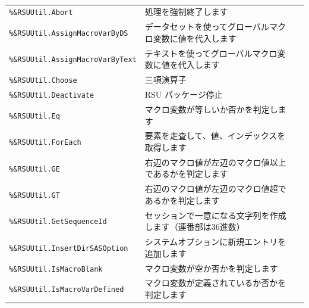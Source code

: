 \paragraph{\DocStrTitleRDMPackageFunctionList}
\begin{center}
{\footnotesize
\begin{xltabular}{\textwidth}{|p{4truecm}|X|p{1.2truecm}|}
\hline
\thead{\DocStrHeaderFunctionName}&\thead{\DocStrDescription}&\thead{\DocStrRefto}\\
\hline
\hline
\texttt{\%\&RSUUtil.Abort}&処理を強制終了します&\\
\hline
\texttt{\%\&RSUUtil.AssignMacroVarByDS}&データセットを使ってグローバルマクロ変数に値を代入します&\\
\hline
\texttt{\%\&RSUUtil.AssignMacroVarByText}&テキストを使ってグローバルマクロ変数に値を代入します&\\
\hline
\texttt{\%\&RSUUtil.Choose}&三項演算子&\\
\hline
\texttt{\%\&RSUUtil.Deactivate}&RSU パッケージ停止&\\
\hline
\texttt{\%\&RSUUtil.Eq}&マクロ変数が等しいか否かを判定します&\\
\hline
\texttt{\%\&RSUUtil.ForEach}&要素を走査して、値、インデックスを取得します&\\
\hline
\texttt{\%\&RSUUtil.GE}&右辺のマクロ値が左辺のマクロ値以上であるかを判定します&\\
\hline
\texttt{\%\&RSUUtil.GT}&右辺のマクロ値が左辺のマクロ値超であるかを判定します&\\
\hline
\texttt{\%\&RSUUtil.GetSequenceId}&セッションで一意になる文字列を作成します（連番部は36進数）&\\
\hline
\texttt{\%\&RSUUtil.InsertDirSASOption}&システムオプションに新規エントリを追加します&\\
\hline
\texttt{\%\&RSUUtil.IsMacroBlank}&マクロ変数が空か否かを判定します&\\
\hline
\texttt{\%\&RSUUtil.IsMacroVarDefined}&マクロ変数が定義されているか否かを判定します&\\

\end{xltabular}}
\end{center}
